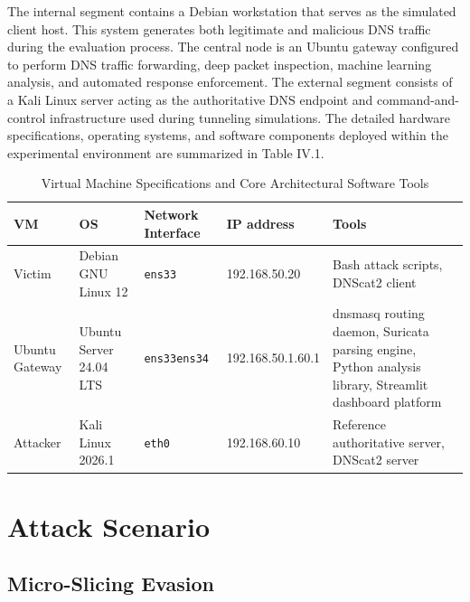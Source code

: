 \documentclass[14pt, a4paper, oneside]{report}
\begin{document}
The internal segment contains a Debian workstation that serves as the simulated client host. This system generates both legitimate and malicious DNS traffic during the evaluation process. The central node is an Ubuntu gateway configured to perform DNS traffic forwarding, deep packet inspection, machine learning analysis, and automated response enforcement. The external segment consists of a Kali Linux server acting as the authoritative DNS endpoint and command-and-control infrastructure used during tunneling simulations. The detailed hardware specifications, operating systems, and software components deployed within the experimental environment are summarized in Table IV.1.

\begin{table}[H]
\centering
\caption{Virtual Machine Specifications and Core Architectural Software Tools}
\vspace{0.1cm}
\label{tab:vm_specifications}
\bgroup
\normalsize
\renewcommand{\arraystretch}{1} 
\begin{tabular}{|p{1.5cm}|p{1.5cm}|p{1.5cm}|p{2.5cm}|p{4.5cm}|}
\hline
\textbf{VM} & \textbf{OS} & \textbf{Network Interface} & \textbf{IP address} & \textbf{Tools} \\ \hline
Victim & Debian GNU Linux 12 & \texttt{ens33} & 192.168.50.20 & Bash attack scripts, DNScat2 client \\ \hline
Ubuntu Gateway & Ubuntu Server 24.04 LTS & \texttt{ens33}\newline \texttt{ens34} & 192.168.50.1\newline 192.168.60.1 & dnsmasq routing daemon, Suricata parsing engine, Python analysis library, Streamlit dashboard platform \\ \hline
Attacker & Kali Linux 2026.1 & \texttt{eth0} & 192.168.60.10 & Reference authoritative server, DNScat2 server \\ \hline
\end{tabular}
\egroup
\end{table}

\section{Attack Scenario}
\label{sec:attack_scenario}

\subsection{Micro-Slicing Evasion}
\end{document}
